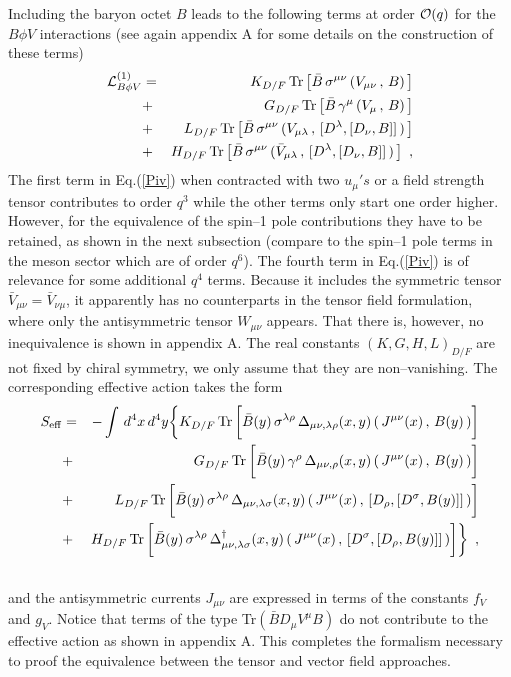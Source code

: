 Including the baryon octet $B$ leads to the following terms at order
${\cal O}(q)$ for the $B\phi V$ interactions (see again appendix A for
some details on the construction of these terms)
\begin{eqnarray}
{\cal L}_{B\phi V}^{(1)}
& = & K_{D/F} \, {\rm Tr} \, \bigl[ \bar{B} \, \sigma^{\mu \nu} \, (
V_{\mu \nu} \, , \, B) \, \bigr] \nonumber \\
& + & G_{D/F} \, {\rm Tr} \, \bigl[ \bar{B} \, \gamma^\mu \, (
V_\mu\, , \, B) \, \bigr] \nonumber \\
& + & L_{D/F} \, {\rm Tr} \, \bigl[ \bar{B} \, \sigma^{\mu \nu} \, (
V_{\mu \lambda} \, , \, [D^\lambda ,[D_\nu , B]] \, ) \, \bigr]
\nonumber \\
& + & H_{D/F} \, {\rm Tr} \, \bigl[ \bar{B} \, \sigma^{\mu \nu} \, (
{\bar V}_{\mu \lambda} \, , \, [ D^\lambda , [ D_\nu , B]] \, ) \, \bigr]
\, \, \, ,
\label{Piv}
\end{eqnarray}
The first term in Eq.(\ref{Piv}) when contracted with two $u_\mu 's$
or a  field
strength tensor contributes to order $q^3$ while the other terms only
start one order higher. However, for the equivalence of the spin--1
pole contributions they have to be retained, as shown in the next
subsection (compare to  the spin--1 pole terms in the meson sector which are
of order $q^6$). The fourth term in Eq.(\ref{Piv}) is of relevance for
some additional  $q^4$ terms. Because it includes the symmetric tensor
$\bar{V}_{\mu \nu} = \bar{V}_{\nu \mu}$, it apparently has no
counterparts in the tensor field formulation, where only the antisymmetric
tensor $W_{\mu \nu}$ appears. That there is, however, no inequivalence
is shown in appendix A.
The real constants $(K,G,H,L)_{D/F}$ are not fixed by chiral symmetry,
we only assume that they are non--vanishing. The corresponding
effective action takes the form
\begin{eqnarray}
S_{\rm eff} &  = & - \int \, d^4x \, d^4y
  \biggl\{ K_{D/F} \, {\rm Tr} \, \biggl[ \bar{B}(y) \,
  \sigma^{\lambda \rho} \,
\Delta_{\mu \nu , \lambda \rho} (x,y) \, ( \, J^{\mu \nu} (x) \, , \, B(y)
\, ) \biggr] \nonumber \\
& + &  G_{D/F} \, {\rm Tr} \, \biggl[ \bar{B}(y) \, \gamma^\rho \,
\Delta_{\mu \nu , \rho } (x,y) \, ( \, J^{\mu \nu}
(x) \, , \, B(y) \, ) \biggr] \nonumber \\
& + & L_{D/F} \, {\rm Tr} \, \biggl[ \bar{B}(y) \, \sigma^{\lambda \rho} \,
\Delta_{\mu \nu , \lambda \sigma} (x,y) \, ( \, J^{\mu \nu}
(x) \, , \, [ D_\rho , [D^\sigma ,B(y)]] \, ) \biggr] \nonumber \\
&  + & H_{D/F} \, {\rm Tr} \, \biggl[ \bar{B}(y) \, \sigma^{\lambda \rho} \,
\Delta_{\mu \nu , \lambda \sigma}^\dagger (x,y) \,
( \, J^{\mu \nu} (x) \, , \,
[D^\sigma , [ D_\rho , B(y) ]] \, ) \biggr] \biggr\} \, \, \, ,
\nonumber \\ & &
\label{seffv}
\end{eqnarray}
and the antisymmetric currents $J_{\mu \nu}$ are expressed in terms of
the constants $f_V$ and $g_V$. Notice that terms of the type
Tr$(\bar{B} D_\mu V^\mu B)$ do not contribute to the effective action
as shown in appendix A. This completes the formalism necessary
to proof the equivalence between the tensor and vector field approaches.

